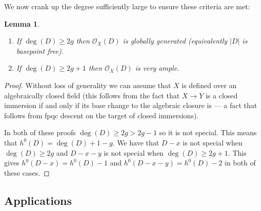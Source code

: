 \documentclass[12pt]{article}
\numberwithin{equation}{section}
\newtheorem{lemma}[theorem]{Lemma}
\theoremstyle{definition}
\theoremstyle{remark}
\newcommand{\Ocal}{\mathcal{O}}
\begin{document}
We now crank up the degree sufficiently large to ensure these criteria are met:
\begin{lemma}
	\begin{enumerate}
		\item If $\deg(D)\geq 2g$ then $\Ocal_X(D)$ is globally generated (equivalently $\vert D\vert$ is basepoint free).
		\item If $\deg(D)\geq 2g+1$ then $\Ocal_X(D)$ is very ample. 
	\end{enumerate}
\end{lemma}
\begin{proof}
	Without loss of generality we can assume that $X$ is defined over an algebraically closed field (this follows from the fact that $X\to Y$ is a closed immersion if and only if its base change to the algebraic closure is --- a fact that follows from fpqc descent on the target of closed immersions).
	
	In both of these proofs $\deg(D)\geq 2g>2g-1$ so it is not special. 
	This means that $h^0(D)=\deg(D)+1-g$.
	We have that $D-x$ is not special when $\deg(D)\geq 2g$ and $D-x-y$ is not special when $\deg(D)\geq 2g+1$.
	This gives $h^0(D-x) = h^0(D)-1$ and $h^0(D-x-y) = h^0(D)-2$ in both of these cases.
\end{proof}

\subsection{Applications}
\end{document}
